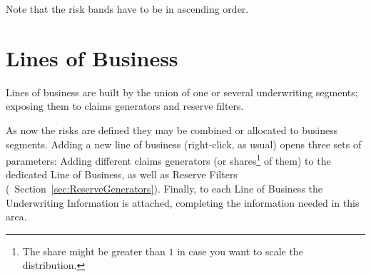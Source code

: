 Note that the risk bands have to be in ascending order.

\section{Lines of Business}

Lines of business are built by the union of one or several underwriting segments; exposing them to claims generators and reserve filters. 

As now the risks are defined they may be combined or allocated to business segments. Adding a new line of business (right-click, as usual) opens three sets of parameters: Adding different claims generators (or shares\footnote{The share might be greater than $1$ in case you want to scale the distribution.} of them) to the dedicated Line of Business, as well as Reserve Filters (\cf~Section~\ref{sec:ReserveGenerators}). Finally, to each Line of Business the Underwriting Information is attached, completing the information needed in this area.

